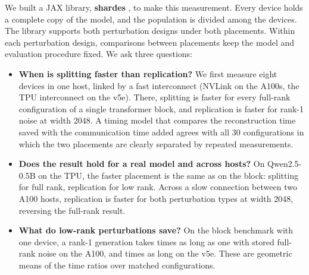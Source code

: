 We built a JAX \citep{jax2018} library\ifanonymous\else, \textbf{shardes}
\citep{shardes},\fi{} to make this measurement. Every device holds a complete copy of
the model, and the population is divided among the devices. The library supports both
perturbation designs under both placements. Within each perturbation design,
comparisons between placements keep the model and evaluation procedure fixed. We ask
three questions:\begin{itemize}
  \item \textbf{When is splitting faster than replication?} We first measure eight
    devices in one host, linked by a fast interconnect (NVLink on the A100s, the TPU
    interconnect on the v5e). There, splitting is faster for every full-rank configuration
    of a single transformer block, and replication is faster for rank-1 noise at width 2048.
    A timing
    model that compares the reconstruction time saved with the communication time added
    agrees with all 30 configurations in which the two placements are clearly separated
    by repeated measurements.
  \item \textbf{Does the result hold for a real model and across hosts?} On
    Qwen2.5-0.5B on the TPU, the faster placement is the same as on the block: splitting
    for full rank, replication for low rank. Across a slow connection between two A100
    hosts, replication is faster for both perturbation types at width 2048, reversing
    the full-rank result.
  \item \textbf{What do low-rank perturbations save?} On the block benchmark with one
    device, a rank-1 generation takes \RankOneOverDenseGPU{} times as long as one with stored
    full-rank noise on the A100, and \RankOneOverDenseTPU{} times as long on the v5e. These are geometric means of the time ratios over
    matched configurations.
\end{itemize}
